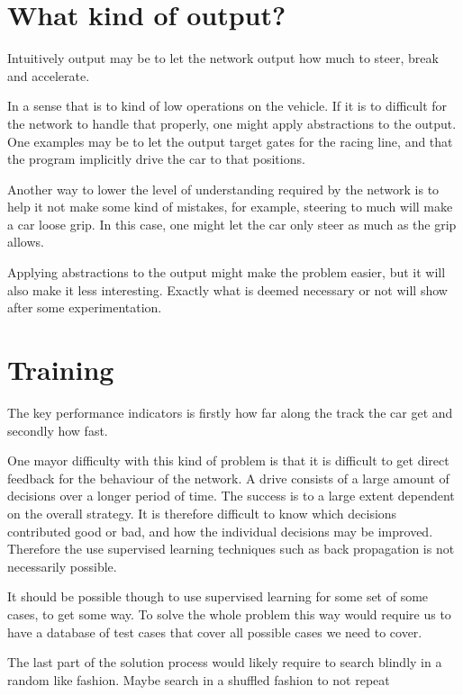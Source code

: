 \section{What kind of output?}
Intuitively output may be to let the network output how much to steer, break and accelerate. 

In a sense that is to kind of low operations on the vehicle. If it is to difficult for the network to handle that properly, one might apply abstractions to the output. One examples may be to let the output target gates for the racing line, and that the program implicitly drive the car to that positions. 

Another way to lower the level of understanding required by the network is to help it not make some kind of mistakes, for example, steering to much will make a car loose grip. In this case, one might let the car only steer as much as the grip allows.

Applying abstractions to the output might make the problem easier, but it will also make it less interesting. Exactly what is deemed necessary or not will show after some experimentation.



\section{Training}
The key performance indicators is firstly how far along the track the car get and secondly how fast.

One mayor difficulty with this kind of problem is that it is difficult to get direct feedback for the behaviour of the network. A drive consists of a large amount of decisions over a longer period of time. The success is to a large extent dependent on the overall strategy. It is therefore difficult to know which decisions contributed good or bad, and how the individual decisions may be improved. Therefore the use supervised learning techniques such as back propagation is not necessarily possible.

It should be possible though to use supervised learning for some set of some cases, to get some way. To solve the whole problem this way would require us to have a database of test cases that cover all possible cases we need to cover. 

The last part of the solution process would likely require to search blindly in a random like fashion. Maybe search in a shuffled fashion to not repeat 
 


